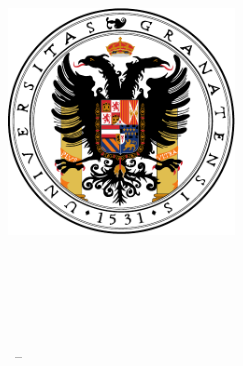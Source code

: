 \begin{titlepage}
    \begin{addmargin}[1cm]{-1cm}
    \begin{center}
        \large  

        \hfill

        \vfill

        \begingroup
            \color{Maroon}\spacedallcaps{\myTitle} \\ \bigskip
        \endgroup


        \vfill

        \includegraphics[width=6cm]{gfx/escudougr} \\ \vfill
		\spacedallcaps{\mySubtitle}\\ \bigskip
		\spacedlowsmallcaps{\myName}\bigskip
          
        \myDepartment \\                            
        \myFaculty \\
        \myUni \\ \bigskip

        \myTime\ -- \myVersion

        \vfill                      

    \end{center}  
  \end{addmargin}       
\end{titlepage}   